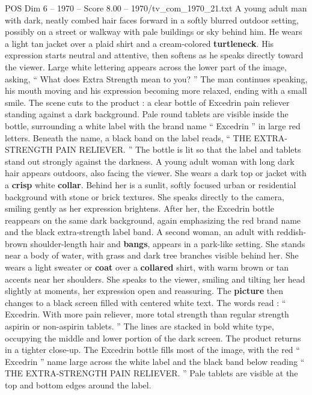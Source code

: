 \begin{textsample}{POS Dim 6 – 1970 – Score 8.00 – 1970/tv\_com\_1970\_21.txt}  \label{ex:f6_pos_050}
A young adult man with dark, neatly combed hair faces forward in a softly blurred outdoor setting, possibly on a street or walkway with pale buildings or sky behind him.
He wears a light tan jacket over a plaid shirt and a cream-colored \textbf{turtleneck}.
His expression starts neutral and attentive, then softens as he speaks directly toward the viewer.
Large white lettering appears across the lower part of the image, asking, “ What does Extra Strength mean to you? ” The man continues speaking, his mouth moving and his expression becoming more relaxed, ending with a small smile.
The scene cuts to the product : a clear bottle of Excedrin pain reliever standing against a dark background.
Pale round tablets are visible inside the bottle, surrounding a white label with the brand name “ Excedrin ” in large red letters.
Beneath the name, a black band on the label reads, “ THE EXTRA-STRENGTH PAIN RELIEVER. ” The bottle is lit so that the label and tablets stand out strongly against the darkness.
A young adult woman with long dark hair appears outdoors, also facing the viewer.
She wears a dark top or jacket with a \textbf{crisp} white \textbf{collar}.
Behind her is a sunlit, softly focused urban or residential background with stone or brick textures.
She speaks directly to the camera, smiling gently as her expression brightens.
After her, the Excedrin bottle reappears on the same dark background, again emphasizing the red brand name and the black extra-strength label band.
A second woman, an adult with reddish-brown shoulder-length hair and \textbf{bangs}, appears in a park-like setting.
She stands near a body of water, with grass and dark tree branches visible behind her.
She wears a light sweater or \textbf{coat} over a \textbf{collared} shirt, with warm brown or tan accents near her shoulders.
She speaks to the viewer, smiling and tilting her head slightly at moments, her expression open and reassuring.
The \textbf{picture} then changes to a black screen filled with centered white text.
The words read : “ Excedrin.
With more pain reliever, more total strength than regular strength aspirin or non-aspirin tablets. ” The lines are stacked in bold white type, occupying the middle and lower portion of the dark screen.
The product returns in a tighter close-up.
The Excedrin bottle fills most of the image, with the red “ Excedrin ” name large across the white label and the black band below reading “ THE EXTRA-STRENGTH PAIN RELIEVER. ” Pale tablets are visible at the top and bottom edges around the label.

\end{textsample}
